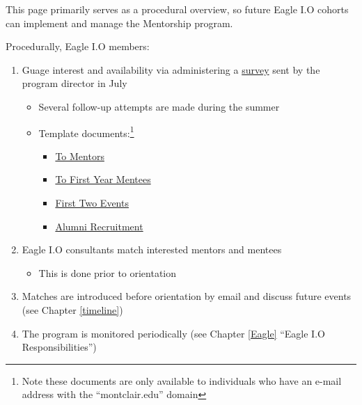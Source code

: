 \documentclass[
  openany]{book}
\providecommand{\tightlist}{%
  \setlength{\itemsep}{0pt}\setlength{\parskip}{0pt}}
\begin{document}
This page primarily serves as a procedural overview, so future Eagle I.O cohorts can implement and manage the Mentorship program.

Procedurally, Eagle I.O members:

\begin{enumerate}
\def\labelenumi{\arabic{enumi})}
\tightlist
\item
  Guage interest and availability via administering a \href{https://survey.az1.qualtrics.com/jfe/form/SV_1TFZ0AIYBpsyh6Z}{survey} sent by the program director in July

  \begin{itemize}
  \tightlist
  \item
    Several follow-up attempts are made during the summer
  \item
    Template documents:\footnote{Note these documents are only available to individuals who have an e-mail address with the ``montclair.edu'' domain}

    \begin{itemize}
    \tightlist
    \item
      \href{https://drive.google.com/open?id=1oDPE6IKPpk-vFezMzAU6uGP9HiTDfH4DSmJT1TQdXYU}{To Mentors}\\
    \item
      \href{https://drive.google.com/open?id=1BWLyBbBIcMEBeRxTNhBaLzbWkEPXThcO44qSh4HwTpw}{To First Year Mentees}\\
    \item
      \href{https://docs.google.com/document/d/1o_W0KReXqGGoR6jn1zabX6syhJ2sNjMZH8RPBwtfbnI/edit?usp=sharing}{First Two Events}
    \item
      \href{https://docs.google.com/document/d/1pGMk17GrXaWcjsuM3HTSouYSGxK_JAm5UVDu6EI7lI0/edit}{Alumni Recruitment}
    \end{itemize}
  \end{itemize}
\item
  Eagle I.O consultants match interested mentors and mentees

  \begin{itemize}
  \tightlist
  \item
    This is done prior to orientation
  \end{itemize}
\item
  Matches are introduced before orientation by email and discuss future events (see Chapter \ref{timeline})
\item
  The program is monitored periodically (see Chapter \ref{Eagle} ``Eagle I.O Responsibilities'')
\end{enumerate}
\end{document}
